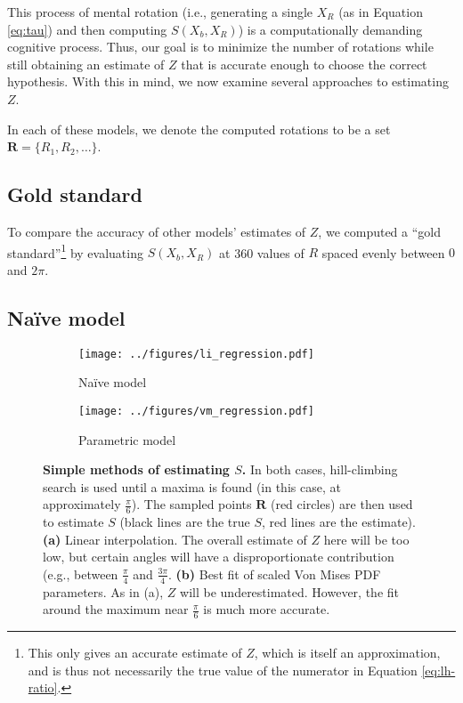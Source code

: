 \documentclass{article} %
\begin{document}
This process of mental rotation (i.e., generating a single $X_R$ (as
in Equation \ref{eq:tau}) and then computing $S(X_b, X_R)$) is a
computationally demanding cognitive process. Thus, our goal is to
minimize the number of rotations while still obtaining an estimate of
$Z$ that is accurate enough to choose the correct hypothesis. With
this in mind, we now examine several approaches to estimating $Z$.

In each of these models, we denote the computed rotations to be a set
$\mathbf{R}=\{R_1, R_2, \ldots{}\}$.

\subsection{Gold standard}

To compare the accuracy of other models' estimates of $Z$, we computed
a ``gold standard''\footnote{This only gives an accurate estimate of
  $Z$, which is itself an approximation, and is thus not necessarily
  the true value of the numerator in Equation \ref{eq:lh-ratio}.} by
evaluating $S(X_b, X_R)$ at 360 values of $R$ spaced evenly between
$0$ and $2\pi$.

\subsection{Na\"ive model}

\begin{figure}[t]
  \centering
  \begin{subfigure}[b]{0.45\textwidth}
    \centering
    \texttt{[image: ../figures/li\_regression.pdf]}
    \caption{Na\"ive model}
    \label{fig:li}
  \end{subfigure}
  \begin{subfigure}[b]{0.45\textwidth}
    \centering
    \texttt{[image: ../figures/vm\_regression.pdf]}
    \caption{Parametric model}
    \label{fig:vm}
  \end{subfigure}
  \caption{\textbf{Simple methods of estimating $S$.} In both cases,
    hill-climbing search is used until a maxima is found (in this
    case, at approximately $\frac{\pi}{6}$). The sampled points
    $\mathbf{R}$ (red circles) are then used to estimate $S$ (black
    lines are the true $S$, red lines are the estimate). \textbf{(a)}
    Linear interpolation. The overall estimate of $Z$ here will be too
    low, but certain angles will have a disproportionate contribution
    (e.g., between $\frac{\pi}{4}$ and $\frac{3\pi}{4}$. \textbf{(b)}
    Best fit of scaled Von Mises PDF parameters. As in (a), $Z$ will
    be underestimated. However, the fit around the maximum near
    $\frac{\pi}{6}$ is much more accurate.}
  \label{fig:simple-models}
\end{figure}
\end{document}
